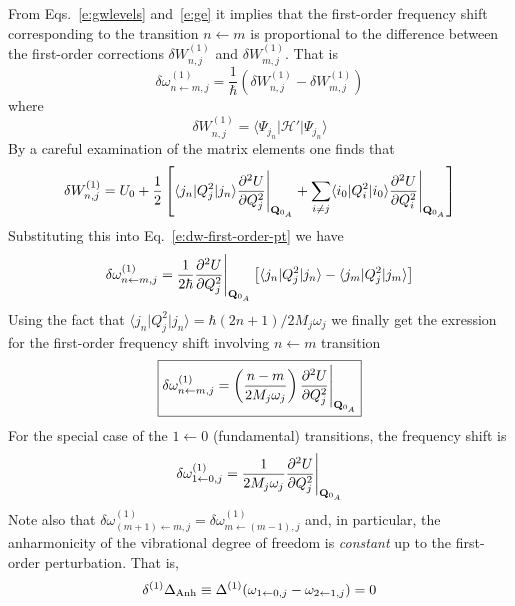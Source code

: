 \documentclass[a4paper,titlepage,twoside,fleqn,12pt]{book}
\begin{document}
\begin{refsection}
From Eqs.~\eqref{e:gwlevels} and~\eqref{e:ge} it implies that 
the first\hyp{}order frequency shift corresponding to the transition
$n\leftarrow m$ 
is proportional to the difference between the first-order corrections 
$\delta W_{n,j}^{(1)}$ and $\delta W_{m,j}^{(1)}$. That is
%
\begin{equation}\label{e:dw-first-order-pt}
\delta \omega_{n\leftarrow m,j}^{(1)} = 
\frac{1}{\hbar} 
\left( \delta W_{n,j}^{(1)} - \delta W_{m,j}^{(1)} \right)
\end{equation}
%
where
%
%
\begin{equation}
\delta W_{n,j}^{(1)} = \langle \Psi_{j_n} \vert \mathscr{H}' \vert \Psi_{j_n} \rangle
\end{equation}
%
By a careful examination of the matrix elements one finds that
%
\begin{equation}
\delta W_{n,j}^{(1)} = U_0 + \frac{1}{2} 
\left[ 
                  \langle j_n \vert Q_j^2 \vert j_n \rangle \frac{\partial^2 U}{\partial Q_j^2} \Bigg|_{{\bf Q}_{0_A}}
  + \sum_{i\ne j} \langle i_0 \vert Q_i^2 \vert i_0 \rangle \frac{\partial^2 U}{\partial Q_i^2} \Bigg|_{{\bf Q}_{0_A}}
\right]
\end{equation}
%
Substituting this into Eq.~\eqref{e:dw-first-order-pt} we have
%
\begin{equation}
\delta \omega_{n\leftarrow m,j}^{(1)} = 
\frac{1}{2\hbar}  \frac{\partial^2 U}{\partial Q_j^2} \Bigg|_{{\bf Q}_{0_A}}
\left[
    \langle j_n \vert Q_j^2 \vert j_n \rangle - \langle j_m \vert Q_j^2 \vert j_m \rangle 
\right]
\end{equation}
%
Using the fact that $\langle j_n \vert Q_j^2 \vert j_n \rangle=\hbar(2n+1)/2M_j\omega_j$
we finally get the exression for the first\hyp{}order frequency shift involving $n\leftarrow m$
transition
%
\begin{equation}
\label{e:buckingham-1st-order}
\boxed{
\delta \omega_{n\leftarrow m,j}^{(1)} = \left( \frac{n-m}{2M_j\omega_j} \right) 
\frac{\partial^2 U}{\partial Q_j^2} \Bigg|_{{\bf Q}_{0_A}}
}
\end{equation}
%
For the special case of the $1\leftarrow 0$ (fundamental) transitions, the frequency
shift is
%
\begin{equation}
\label{e:buckingham-1st-order-fundamental}
\delta \omega_{1\leftarrow 0,j}^{(1)} =  \frac{1}{2M_j\omega_j}
\frac{\partial^2 U}{\partial Q_j^2} \Bigg|_{{\bf Q}_{0_A}}
\end{equation}
%
Note also that $\delta \omega_{(m+1)\leftarrow m,j}^{(1)} = \delta \omega_{m\leftarrow (m-1),j}^{(1)}$
and, in particular, the anharmonicity of the vibrational degree of freedom is \emph{constant}
up to the first\hyp{}order perturbation. That is,
%
\begin{equation}  \label{e:anharm-1st-order}
\delta^{(1)} \Delta_{\rm Anh} \equiv \Delta^{(1)} (\omega_{1\leftarrow 0,j} - \omega_{2\leftarrow 1,j}) = 0
\end{equation}
%


\end{refsection}
\end{document}

